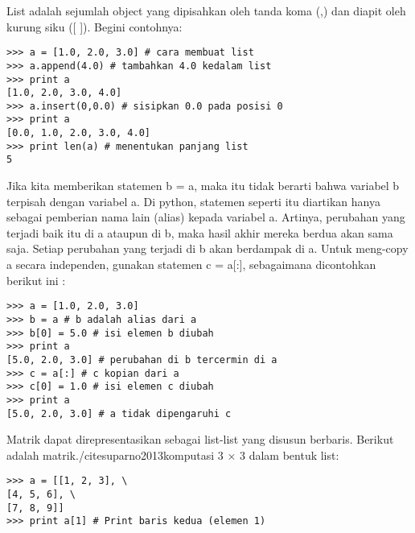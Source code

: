 List adalah sejumlah object yang dipisahkan oleh tanda koma (,) dan diapit oleh kurung siku
([ ]). Begini contohnya:
\begin{verbatim}
>>> a = [1.0, 2.0, 3.0] # cara membuat list
>>> a.append(4.0) # tambahkan 4.0 kedalam list
>>> print a
[1.0, 2.0, 3.0, 4.0] 
>>> a.insert(0,0.0) # sisipkan 0.0 pada posisi 0
>>> print a
[0.0, 1.0, 2.0, 3.0, 4.0]
>>> print len(a) # menentukan panjang list
5
\end{verbatim}
Jika kita memberikan statemen b = a, maka itu tidak berarti bahwa variabel b terpisah dengan
variabel a. Di python, statemen seperti itu diartikan hanya sebagai pemberian nama lain
(alias) kepada variabel a. Artinya, perubahan yang terjadi baik itu di a ataupun di b, maka hasil
akhir mereka berdua akan sama saja. Setiap perubahan yang terjadi di b akan berdampak di a.
Untuk meng-copy a secara independen, gunakan statemen c = a[:], sebagaimana dicontohkan
berikut ini :
\begin{verbatim}
>>> a = [1.0, 2.0, 3.0]
>>> b = a # b adalah alias dari a
>>> b[0] = 5.0 # isi elemen b diubah
>>> print a
[5.0, 2.0, 3.0] # perubahan di b tercermin di a
>>> c = a[:] # c kopian dari a
>>> c[0] = 1.0 # isi elemen c diubah
>>> print a
[5.0, 2.0, 3.0] # a tidak dipengaruhi c
\end{verbatim}
Matrik dapat direpresentasikan sebagai list-list yang disusun berbaris. Berikut adalah matrik./cite{suparno2013komputasi}
3 × 3 dalam bentuk list:
\begin{verbatim}
>>> a = [[1, 2, 3], \
[4, 5, 6], \
[7, 8, 9]]
>>> print a[1] # Print baris kedua (elemen 1)
\end{verbatim}
